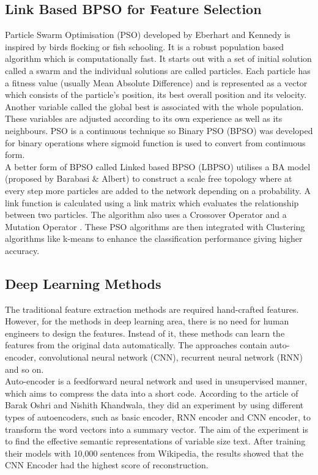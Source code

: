 \documentclass[12pt]{article}
\begin{document}
\subsection{Link Based BPSO for Feature Selection}
Particle Swarm Optimisation (PSO) developed by Eberhart and Kennedy \cite{kennedy2011particle} is inspired by birds flocking or fish schooling. It is a robust population based algorithm which is computationally fast. It starts out with a set of initial solution called a swarm and the individual solutions are called particles. Each particle has a fitness value (usually Mean Absolute Difference) and is represented as a vector which consists of the particle’s position, its best overall position and its velocity. Another variable called the global best is associated with the whole population. These variables are adjusted according to its own experience as well as its neighbours. PSO is a continuous technique so Binary PSO (BPSO) was developed \cite{kennedy1997discrete} for binary operations where sigmoid function is used to convert from continuous form. \\

A better form of BPSO called Linked based BPSO (LBPSO) \cite{kushwaha2018link} utilises a BA model (proposed by Barabasi \& Albert) \cite{barabasi2000scale} to construct a scale free topology where at every step more particles are added to the network depending on a probability. A link function is calculated using a link matrix which evaluates the relationship between two particles. The algorithm also uses a Crossover Operator and a Mutation Operator \cite{bolaji2016comprehensive}. These PSO algorithms are then integrated with Clustering algorithms like k-means to enhance the classification performance giving higher accuracy. \\

\subsection{Deep Learning Methods}
The traditional feature extraction methods are required hand-crafted features. However, for the methods in deep learning area, there is no need for human engineers to design the features. Instead of it, these methods can learn the features from the original data automatically\cite{liang2017text}. The approaches contain auto-encoder, convolutional neural network (CNN), recurrent neural network (RNN) and so on.\\
 
 
Auto-encoder is a feedforward neural network and used in unsupervised manner\cite{oshri2016there}, which aims to compress the data into a short code. According to the article of Barak Oshri and Nishith Khandwala, they did an experiment by using different types of autoencoders, such as basic encoder, RNN encoder and CNN encoder, to transform the word vectors into a summary vector. The aim of the experiment is to find the effective semantic representations of variable size text. After training their models with 10,000 sentences from Wikipedia, the results showed that the CNN Encoder had the highest score of reconstruction.\\
\end{document}
